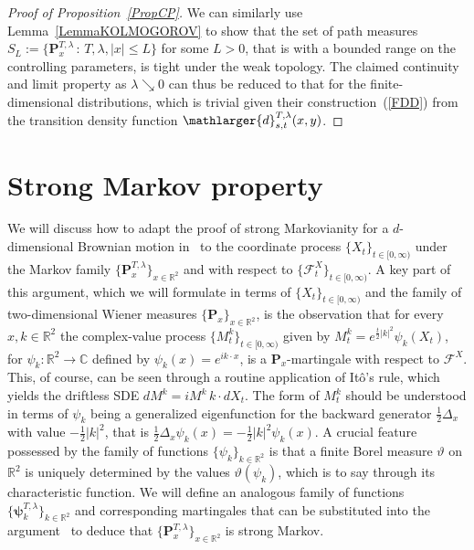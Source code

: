 \documentclass[10pt]{article}
\numberwithin{equation}{section}
\theoremstyle{definition}
\newcommand{\R}{{\mathbb R}}
\newcommand{\C}{{\mathbb C}}
\begin{document}
\begin{appendix}
\begin{proof}[Proof of Proposition~\ref{PropCP}]
We  can similarly use Lemma~\ref{LemmaKOLMOGOROV}  to show that the set of path measures $ S_L:= \big\{ \mathbf{P}_{x}^{T,\lambda}\, :\, T,\lambda,|x|\leq L\big\}$ for some $L>0$, that is with a bounded range on the controlling parameters,  is tight under the weak topology.  The claimed continuity and limit property as $\lambda\searrow 0$ can thus be reduced to that for the finite-dimensional distributions, which is trivial given their construction~(\ref{FDD})  from the transition density function $\mathlarger{d}_{s,t}^{T,\lambda}(x,y)$.
\end{proof}





\section{Strong Markov property}\label{AppendixSMP}
We will discuss how to adapt the proof of strong Markovianity for a $d$-dimensional Brownian motion in~\cite[Section 2.6(C)]{Karatzas} to the coordinate process $\{X_t\}_{t\in [0,\infty) }$ under the Markov family $\{\mathbf{P}^{T,\lambda}_{x}\}_{x\in \R^2}$ and with respect to  $\{\mathscr{F}_t^X\}_{t\in [0,\infty) }$. A key part of this argument, which we will formulate in terms of  $\{X_t\}_{t\in [0,\infty) }$  and the family of two-dimensional Wiener measures  $\{\mathbf{P}_{x}\}_{x\in \R^2}$, is the observation that for every $x,k\in \R^2$ the complex-value  process $\{M_t^k\}_{t\in [0,\infty)}$ given by  $M_t^{k} = e^{\frac{t}{2}|k|^2} \psi_k(X_t) $, for $\psi_k:\R^2\rightarrow \C$  defined by $\psi_k(x)=e^{ik\cdot x}$,   is a $\mathbf{P}_{x}$-martingale with respect to $\mathscr{F}^X$.  This, of course, can be seen through a routine application of It\^o's rule, which yields the driftless SDE $dM^{k} =i M^{k}\,k\cdot dX_t $.  The form of $M^{k}_t$ should be understood in terms of $\psi_k $ being a generalized eigenfunction for the backward generator $\frac{1}{2}\Delta_x$  with value $-\frac{1}{2}|k|^2$, that is $\frac{1}{2}\Delta_x \psi_k(x)=-\frac{1}{2}|k|^2\psi_k(x)$. A crucial feature possessed by the family of functions  
$\{\psi_k\}_{k\in \R^2}$ is  that a finite Borel measure $\vartheta$ on $\R^2$ is uniquely determined by the values $ \vartheta(  \psi_k ) $, which is to say through its characteristic function. 
We will define an analogous family of functions $\{\boldsymbol{\psi}_k^{T,\lambda}\}_{k\in \R^2}$ and corresponding martingales  that  can be substituted into the argument~\cite[Section 2.6(C)]{Karatzas} to deduce that $\{\mathbf{P}^{T,\lambda}_{x}\}_{x\in \R^2}$ is  strong Markov. 




\end{appendix}
\end{document}
